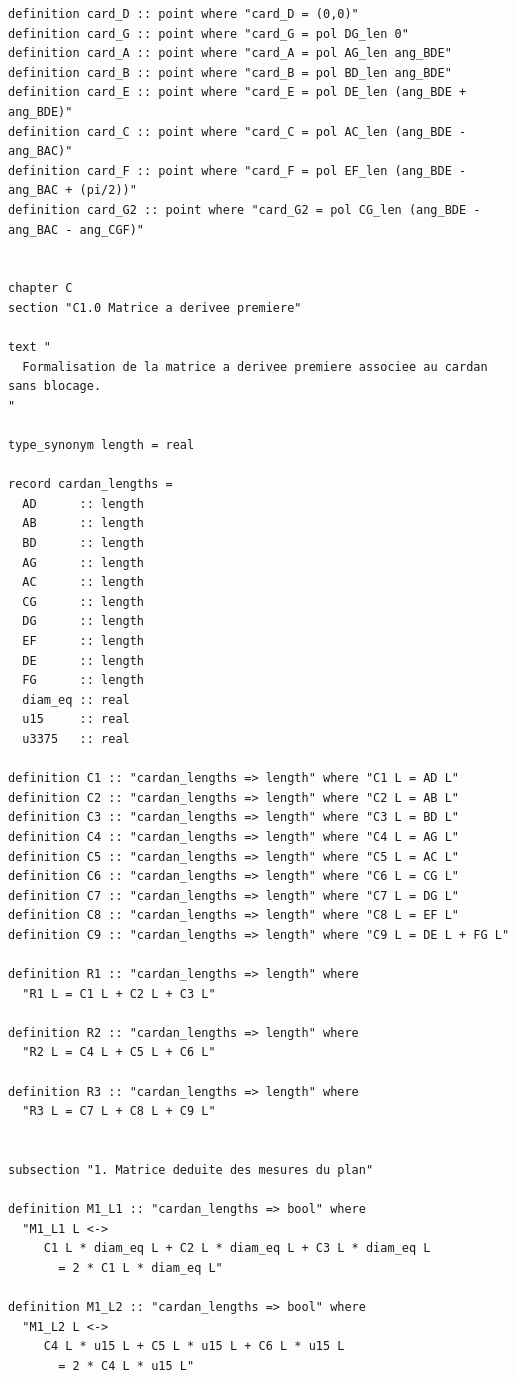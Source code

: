 \documentclass[12pt,a4paper]{article}
\theoremstyle{definition}
\theoremstyle{remark}
\begin{document}
\begin{verbatim}
definition card_D :: point where "card_D = (0,0)"
definition card_G :: point where "card_G = pol DG_len 0"
definition card_A :: point where "card_A = pol AG_len ang_BDE"
definition card_B :: point where "card_B = pol BD_len ang_BDE"
definition card_E :: point where "card_E = pol DE_len (ang_BDE + ang_BDE)"
definition card_C :: point where "card_C = pol AC_len (ang_BDE - ang_BAC)"
definition card_F :: point where "card_F = pol EF_len (ang_BDE - ang_BAC + (pi/2))"
definition card_G2 :: point where "card_G2 = pol CG_len (ang_BDE - ang_BAC - ang_CGF)"


chapter C
section "C1.0 Matrice a derivee premiere"

text "
  Formalisation de la matrice a derivee premiere associee au cardan sans blocage.
"

type_synonym length = real

record cardan_lengths =
  AD      :: length
  AB      :: length
  BD      :: length
  AG      :: length
  AC      :: length
  CG      :: length
  DG      :: length
  EF      :: length
  DE      :: length
  FG      :: length
  diam_eq :: real
  u15     :: real
  u3375   :: real

definition C1 :: "cardan_lengths => length" where "C1 L = AD L"
definition C2 :: "cardan_lengths => length" where "C2 L = AB L"
definition C3 :: "cardan_lengths => length" where "C3 L = BD L"
definition C4 :: "cardan_lengths => length" where "C4 L = AG L"
definition C5 :: "cardan_lengths => length" where "C5 L = AC L"
definition C6 :: "cardan_lengths => length" where "C6 L = CG L"
definition C7 :: "cardan_lengths => length" where "C7 L = DG L"
definition C8 :: "cardan_lengths => length" where "C8 L = EF L"
definition C9 :: "cardan_lengths => length" where "C9 L = DE L + FG L"

definition R1 :: "cardan_lengths => length" where
  "R1 L = C1 L + C2 L + C3 L"

definition R2 :: "cardan_lengths => length" where
  "R2 L = C4 L + C5 L + C6 L"

definition R3 :: "cardan_lengths => length" where
  "R3 L = C7 L + C8 L + C9 L"


subsection "1. Matrice deduite des mesures du plan"

definition M1_L1 :: "cardan_lengths => bool" where
  "M1_L1 L <->
     C1 L * diam_eq L + C2 L * diam_eq L + C3 L * diam_eq L
       = 2 * C1 L * diam_eq L"

definition M1_L2 :: "cardan_lengths => bool" where
  "M1_L2 L <->
     C4 L * u15 L + C5 L * u15 L + C6 L * u15 L
       = 2 * C4 L * u15 L"


\end{verbatim}
\end{document}
